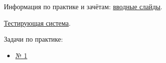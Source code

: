 \documentclass[12pt,a4paper]{article}
\begin{document}
    Информация по практике и зачётам: \href{http://acm.math.spbu.ru/~gassa/bachelor-2020/200907_m20_slides.ru.pdf}{вводные слайды}.

    \href{http://acm.math.spbu.ru/tsweb}{Тестирующая система}.

    \vspace{1em} Задачи по практике:
    \begin{itemize}
        \item \href{http://acm.math.spbu.ru/~gassa/bachelor-2020/200907_m20.pdf}{№ 1}
    \end{itemize}
\end{document}
